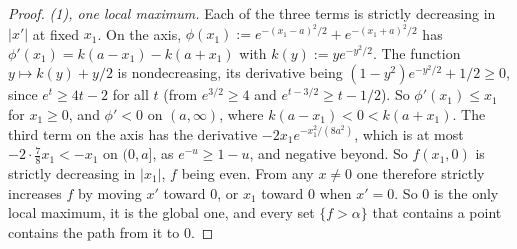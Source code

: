\begin{proof}
\leanok
{}
\emph{(1), one local maximum.} Each of the three terms is strictly decreasing in $|x'|$ at fixed
$x_1$. On the axis, $\phi(x_1) := e^{-(x_1 - a)^2/2} + e^{-(x_1 + a)^2/2}$ has
$\phi'(x_1) = k(a - x_1) - k(a + x_1)$ with $k(y) := ye^{-y^2/2}$. The function $y \mapsto k(y) + y/2$
is nondecreasing, its derivative being $(1 - y^2)e^{-y^2/2} + 1/2 \ge 0$, since
$e^t \ge 4t - 2$ for all $t$ (from $e^{3/2} \ge 4$ and $e^{t - 3/2} \ge t - 1/2$). So
$\phi'(x_1) \le x_1$ for $x_1 \ge 0$, and $\phi' < 0$ on $(a, \infty)$, where $k(a - x_1) < 0 <
k(a + x_1)$. The third term on the axis has the derivative $-2x_1e^{-x_1^2/(8a^2)}$, which is at
most $-2 \cdot \frac{7}{8}x_1 < -x_1$ on $(0, a]$, as $e^{-u} \ge 1 - u$, and negative beyond. So $f(x_1, 0)$ is strictly decreasing in $|x_1|$, $f$ being even. From any
$x \ne 0$ one therefore strictly increases $f$ by moving $x'$ toward $0$, or $x_1$ toward $0$ when
$x' = 0$. So $0$ is the only local maximum, it is the global one, and every set $\{f > \alpha\}$ that
contains a point contains the path from it to $0$.


\end{proof}
